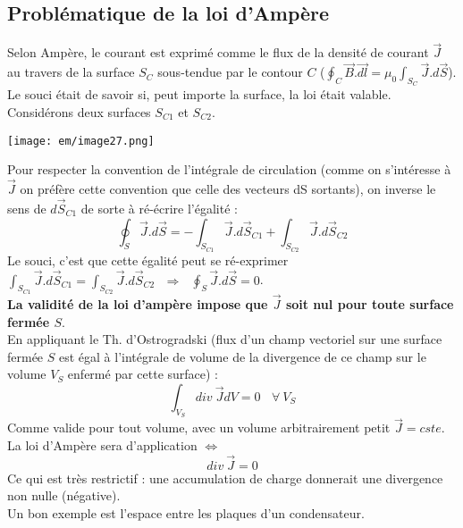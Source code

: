 \documentclass[british,french,11pt, a4paper, openany]{book}
\begin{document}
	\subsection{Problématique de la loi d'Ampère}
	Selon Ampère, le courant est exprimé comme le flux de la densité de courant $\vec{J}$ au travers de la surface $S_C$ sous-tendue par le contour $C$ ($\oint_C \vec{B}.\vec{dl} = \mu_0 \int_{S_C} \vec{J}.d\vec{S}$).\\
	Le souci était de savoir si, peut importe la surface, la loi était valable. Considérons deux surfaces $S_{C1}$ et $S_{C2}$.
	
	\begin{center}
		\texttt{[image: em/image27.png]}\\
	\end{center}
	Pour respecter la convention de l'intégrale de circulation (comme on s'intéresse à $\vec{J}$ on préfère cette convention que celle des vecteurs dS sortants), on inverse le sens de $d\vec{S}_{C1}$ de sorte à ré-écrire l'égalité :
	\begin{equation}
		\oint_S \vec{J}.d\vec{S} = - \int_{S_{C1}} \vec{J}.d\vec{S}_{C1} + \int_{S_{C2}} \vec{J}.d\vec{S}_{C2} 
	\end{equation}
	Le souci, c'est que cette égalité peut se ré-exprimer  $\int_{S_{C1}} \vec{J}.d\vec{S}_{C1} = \int_{S_{C2}} \vec{J}.d\vec{S}_{C2}\ \ \ \Rightarrow\ \ \ \oint_S \vec{J}.d\vec{S} = 0$.\\
	
	\textbf{La validité de la loi d'ampère impose que $\vec{J}$ soit nul pour toute surface fermée $S$}.\\
	En appliquant le Th. d'Ostrogradski (flux d'un champ vectoriel sur une surface fermée $S$ est égal à l'intégrale de volume de la divergence de ce champ sur le volume $V_S$ enfermé par cette surface) :
	\begin{equation}
		\int_{V_S} div\ \vec{J} dV = 0\ \ \ \ \forall\ V_S
	\end{equation}
	Comme valide pour tout volume, avec un volume arbitrairement petit $\vec{J} = cste$. La loi d'Ampère sera d'application $\Leftrightarrow$
	\begin{equation}
		div\ \vec{J} = 0
	\end{equation}
	Ce qui est très restrictif : une accumulation de charge donnerait une divergence non nulle (négative).\\
	Un bon exemple est l'espace entre les plaques d'un condensateur.
	
\end{document}
